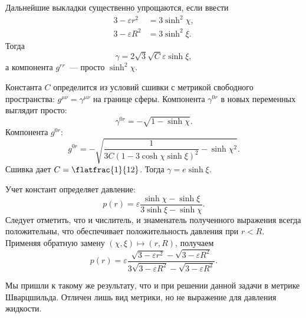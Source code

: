 \documentclass[\docroot/reports/draft/report.tex]{subfiles}
\begin{document}
    Дальнейшие выкладки существенно упрощаются, если ввести
    \begin{align*}
        3 - \varepsilon r^2 &= 3 \sinh^2\chi , \\
        3 - \varepsilon R^2 &= 3 \sinh^2\xi .
    \end{align*}
    Тогда
    \begin{equation*}
        \gamma = 2 \sqrt{3} \sqrt{C} \varepsilon \sinh\xi ,
    \end{equation*}
    а компонента $g^{rr}$~--- просто $\sinh^2\chi$.

    Константа $C$ определится из условий сшивки с метрикой свободного пространства: $g^{\mu\nu} = \gamma^{\mu\nu}$ на границе сферы. Компонента $\gamma^{0r}$ в новых переменных выглядит просто:
    \begin{equation*}
        \gamma^{0r} = - \sqrt{1 - \sinh\chi} .
    \end{equation*}
    Компонента $g^{0r}$:
    \begin{equation*}
        g^{0r} = - \sqrt{
            \frac{1}{3 C (1 - 3 \cosh\chi \sinh\xi)^2} - \sinh\chi^2
        } .
    \end{equation*}
    Сшивка дает $C = \flatfrac{1}{12}$. Тогда $\gamma = e \sinh\xi$.

    Учет констант определяет давление:
    \begin{equation*}
        p(r) = \varepsilon \frac{\sinh\chi - \sinh\xi}{3\sinh\xi - \sinh\chi} .
    \end{equation*}
    Следует отметить, что и числитель, и знаменатель полученного выражения всегда положительны, что обеспечивает положительность давления при $r < R$. Применяя обратную замену $(\chi,\xi) \mapsto (r,R)$, получаем
    \begin{equation*}
        p(r) = \varepsilon \frac{\sqrt{3 - \varepsilon r^2} - \sqrt{3 - \varepsilon R^2}}{3 \sqrt{3 - \varepsilon R^2} - \sqrt{3 - \varepsilon R^2}} .
    \end{equation*}

    Мы пришли к такому же результату, что и при решении данной задачи в метрике Шварцшильда. Отличен лишь вид метрики, но не выражение для давления жидкости.

\end{document}

